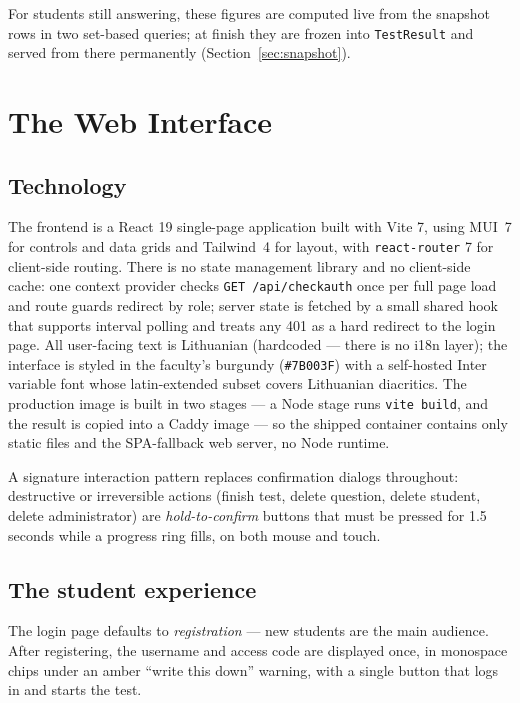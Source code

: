 \documentclass[11pt,a4paper]{article}
\newcommand{\code}[1]{\texttt{#1}}
\begin{document}
For students still answering, these figures are computed live from the
snapshot rows in two set-based queries; at finish they are frozen into
\code{TestResult} and served from there permanently
(Section~\ref{sec:snapshot}).

\section{The Web Interface}
\label{sec:frontend}

\subsection{Technology}

The frontend is a React 19 single-page application built with Vite 7,
using MUI~7 for controls and data grids and Tailwind~4 for layout,
with \code{react-router} 7 for client-side routing. There is no state
management library and no client-side cache: one context provider
checks \code{GET /api/checkauth} once per full page load and route
guards redirect by role; server state is fetched by a small shared
hook that supports interval polling and treats any 401 as a hard
redirect to the login page. All user-facing text is Lithuanian
(hardcoded --- there is no i18n layer); the interface is styled in the
faculty's burgundy (\code{\#7B003F}) with a self-hosted Inter
variable font whose latin-extended subset covers Lithuanian
diacritics. The production image is built in two stages --- a Node
stage runs \code{vite build}, and the result is copied into a Caddy
image --- so the shipped container contains only static files and the
SPA-fallback web server, no Node runtime.

A signature interaction pattern replaces confirmation dialogs
throughout: destructive or irreversible actions (finish test, delete
question, delete student, delete administrator) are
\emph{hold-to-confirm} buttons that must be pressed for 1.5 seconds
while a progress ring fills, on both mouse and touch.

\subsection{The student experience}

The login page defaults to \emph{registration} --- new students are
the main audience. After registering, the username and access code are
displayed once, in monospace chips under an amber ``write this down''
warning, with a single button that logs in and starts the test.
\end{document}
